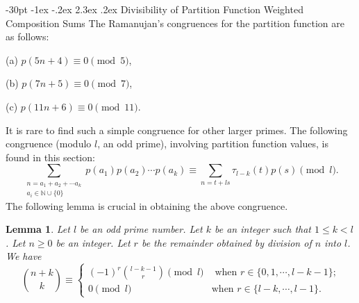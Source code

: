 \documentclass[10pt]{article}
\makeatletter
\renewcommand\section{\@startsection {section}{1}{\z@}
{-30pt \@plus -1ex \@minus -.2ex}
{2.3ex \@plus.2ex}
{\normalfont\normalsize\bfseries\boldmath}}
\newtheorem{lemma}[theorem]{Lemma}
\theoremstyle{definition}
\makeatother
\begin{document}
\section{ Divisibility of Partition Function Weighted Composition Sums }
The Ramanujan's congruences for the partition function are as follows:
\begin{description}
\item{(a)} $p(5n+4)\equiv 0\pmod{5}$,
\item{(b)} $p(7n+5)\equiv 0\pmod{7}$,
\item{(c)} $p(11n+6)\equiv 0\pmod{11}$.
\end{description}
It is rare to find such a simple congruence for other larger primes. The following congruence (modulo $l$, an odd prime), involving partition function values, is found in this section:
\begin{equation*}
\sum_{\substack{{n=a_1+a_2+\cdots a_k}\\{a_{i}\in\mathbb{N}\cup\{0\}}}}p(a_{1})p(a_{2})\cdots p(a_{k})\equiv \sum_{n=t+ls}\tau_{l-k}(t)p(s)\pmod{l}.
\end{equation*}
The following lemma is crucial in obtaining the above congruence.
\begin{lemma}\label{binomialmodulooddprime}
Let $l$ be an odd prime number. Let $k$ be an integer such that $1\leq k<l$. Let $n\geq 0$ be an integer. Let $r$ be the remainder obtained by division of $n$ into $l$. We have
\begin{equation}
{{n+k}\choose{k}}\equiv \begin{cases}(-1)^{r}{{l-k-1}\choose{r}}\pmod{l}&\text{ when $r\in\{0,1,\cdots ,l-k-1\}$;}\\
0\pmod{l}&\text{when $r\in\{l-k,\cdots ,l-1\}$.}
\end{cases}
\end{equation}
\end{lemma}
\end{document}
